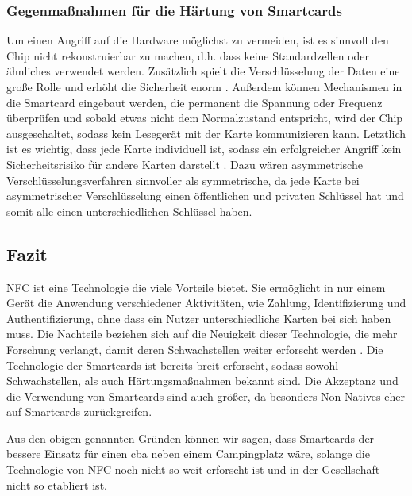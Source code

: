 \subsubsection{Gegenmaßnahmen für die Härtung von Smartcards}
Um einen Angriff auf die Hardware möglichst zu vermeiden, ist es sinnvoll den Chip nicht rekonstruierbar zu machen,
d.h. dass keine Standardzellen oder ähnliches verwendet werden. Zusätzlich spielt die Verschlüsselung 
der Daten eine große Rolle und erhöht die Sicherheit enorm \cite{refst:ARES}. Außerdem können Mechanismen in 
die Smartcard eingebaut werden, die permanent die Spannung oder Frequenz überprüfen und sobald etwas
nicht dem Normalzustand entspricht, wird der Chip ausgeschaltet, sodass kein Lesegerät mit der 
Karte kommunizieren kann. Letztlich ist es wichtig, dass jede Karte individuell ist, sodass ein 
erfolgreicher Angriff kein Sicherheitsrisiko für andere Karten darstellt \cite{refmas:ASSS}. 
Dazu wären asymmetrische Verschlüsselungsverfahren sinnvoller als symmetrische, da jede Karte bei
asymmetrischer Verschlüsselung einen öffentlichen und privaten Schlüssel hat und somit alle einen unterschiedlichen
Schlüssel haben.


\subsection{Fazit}

NFC ist eine Technologie die viele Vorteile bietet. Sie ermöglicht in nur einem Gerät die Anwendung
verschiedener Aktivitäten, wie Zahlung, Identifizierung und Authentifizierung, ohne dass ein Nutzer 
unterschiedliche Karten bei sich haben muss. Die Nachteile beziehen sich auf die Neuigkeit dieser Technologie,
die mehr Forschung verlangt, damit deren Schwachstellen weiter erforscht werden \cite{refart:ALSI}. Die
Technologie der Smartcards ist bereits breit erforscht, sodass sowohl Schwachstellen, als auch Härtungsmaßnahmen
bekannt sind. Die Akzeptanz und die Verwendung von Smartcards sind auch größer, da besonders Non-Natives eher auf
Smartcards zurückgreifen.

Aus den obigen genannten Gründen können wir sagen, dass Smartcards der bessere Einsatz für einen cba
neben einem Campingplatz wäre, solange die Technologie von NFC noch nicht so weit erforscht ist und in der 
Gesellschaft nicht so etabliert ist.
